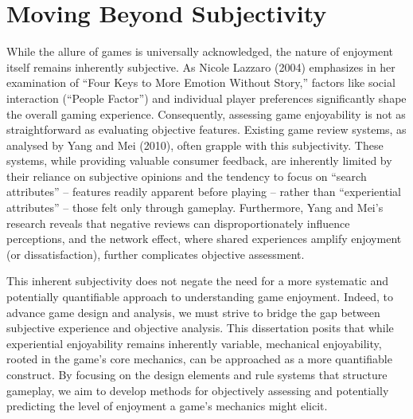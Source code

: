 \documentclass[12pt]{report}
\begin{document}
	\section{Moving Beyond Subjectivity}
	While the allure of games is universally acknowledged, the nature of enjoyment itself remains inherently subjective. As Nicole Lazzaro (2004) emphasizes in her examination of “Four Keys to More Emotion Without Story,” factors like social interaction (``People Factor'') and individual player preferences significantly shape the overall gaming experience. Consequently, assessing game enjoyability is not as straightforward as evaluating objective features. Existing game review systems, as analysed by Yang and Mei (2010), often grapple with this subjectivity. These systems, while providing valuable consumer feedback, are inherently limited by their reliance on subjective opinions and the tendency to focus on “search attributes” – features readily apparent before playing – rather than “experiential attributes” – those felt only through gameplay. Furthermore, Yang and Mei’s research reveals that negative reviews can disproportionately influence perceptions, and the network effect, where shared experiences amplify enjoyment (or dissatisfaction), further complicates objective assessment.
	
	This inherent subjectivity does not negate the need for a more systematic and potentially quantifiable approach to understanding game enjoyment. Indeed, to advance game design and analysis, we must strive to bridge the gap between subjective experience and objective analysis. This dissertation posits that while experiential enjoyability remains inherently variable, mechanical enjoyability, rooted in the game's core mechanics, can be approached as a more quantifiable construct. By focusing on the design elements and rule systems that structure gameplay, we aim to develop methods for objectively assessing and potentially predicting the level of enjoyment a game's mechanics might elicit.
	
\end{document}
